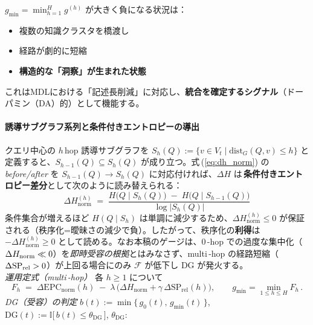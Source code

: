 \documentclass[ja=standard,xelatex]{bxjsarticle}
\newcommand{\F}{\mathcal{F}}
\begin{document}
$g_{\min} = \min_{h=1}^{H} g^{(h)}$ が大きく負になる状況は：
\begin{itemize}
  \item 複数の知識クラスタを橋渡し
  \item 経路が劇的に短縮
  \item \textbf{構造的な「洞察」が生まれた状態}
\end{itemize}

これはMDLにおける「記述長削減」に対応し、\textbf{統合を確定するシグナル}（ドーパミン（DA）的）として機能する。
\\[0.2em]
\paragraph{誘導サブグラフ系列と条件付きエントロピーの導出}
クエリ中心の $h$\,hop 誘導サブグラフを $S_h(Q):=\{v\in V_t\mid \mathrm{dist}_G(Q,v)\le h\}$ と定義すると、$S_{h-1}(Q)\subseteq S_h(Q)$ が成り立つ。式\,(\ref{eq:dh_norm}) の\,\emph{before/after} を $S_{h-1}(Q)\to S_h(Q)$ に対応付ければ、$\Delta H$ は\,\textbf{条件付きエントロピー差分}として次のように読み替えられる：
\begin{equation}
  \boxed{\;\Delta H^{(h)}_{\mathrm{norm}}\;=\;\frac{H\big(Q\mid S_h(Q)\big)\; -\; H\big(Q\mid S_{h-1}(Q)\big)}{\log |S_h(Q)|}\;}\label{eq:cond_dh_b}
\end{equation}
条件集合が増えるほど $H(Q\mid S_h)$ は単調に減少するため、$\Delta H^{(h)}_{\mathrm{norm}}\le 0$ が保証される（秩序化=曖昧さの減少で負）。したがって、秩序化の\textbf{利得}は $-\Delta H^{(h)}_{\mathrm{norm}}\ge 0$ として読める。なお本稿のゲージは、0\,\mbox{-}hop での過度な集中化（$\Delta H_{\rm norm}\ll0$）を\emph{即時受容の根拠}とはみなさず、multi\,\mbox{-}hop の経路短縮（$\Delta\mathrm{SP}_{\rm rel}>0$）が上回る場合にのみ $\F$ が低下し DG が発火する。
\\[0.2em]
\textit{運用定式（multi\,\mbox{-}hop）}\; 各 $h\ge1$ について
\begin{equation}
  F_h\;=\;\Delta\mathrm{EPC}_{\mathrm{norm}}(h)\; -\; \lambda\,\Big(\Delta H_{\mathrm{norm}} + \gamma\,\Delta\mathrm{SP}_{\mathrm{rel}}(h)\Big),\qquad
  g_{\min}=\min_{1\le h\le H} F_h\,.
  \label{eq:fh_runtime_b}
\end{equation}
\noindent \textit{DG（受容）の判定}\; \quad $b(t) := \min\{\, g_0(t),\, g_{\min}(t)\,\}$,\;\; $\mathrm{DG}(t) := \mathbb{I}\big[\, b(t) \le \theta_{\mathrm{DG}}\,\big]$, \;\; $\theta_{\mathrm{DG}}$:\,
\end{document}
